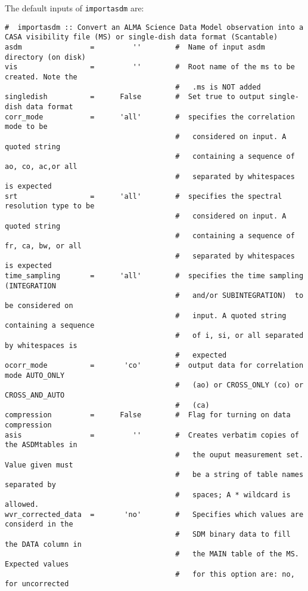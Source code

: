 The default inputs of {\tt importasdm} are:

\small
\begin{verbatim}
#  importasdm :: Convert an ALMA Science Data Model observation into a CASA visibility file (MS) or single-dish data format (Scantable)
asdm                =         ''        #  Name of input asdm directory (on disk)
vis                 =         ''        #  Root name of the ms to be created. Note the
                                        #   .ms is NOT added
singledish          =      False        #  Set true to output single-dish data format
corr_mode           =      'all'        #  specifies the correlation mode to be
                                        #   considered on input. A quoted string
                                        #   containing a sequence of ao, co, ac,or all
                                        #   separated by whitespaces is expected
srt                 =      'all'        #  specifies the spectral resolution type to be
                                        #   considered on input. A quoted string
                                        #   containing a sequence of fr, ca, bw, or all
                                        #   separated by whitespaces is expected
time_sampling       =      'all'        #  specifies the time sampling (INTEGRATION
                                        #   and/or SUBINTEGRATION)  to be considered on
                                        #   input. A quoted string containing a sequence
                                        #   of i, si, or all separated by whitespaces is
                                        #   expected
ocorr_mode          =       'co'        #  output data for correlation mode AUTO_ONLY
                                        #   (ao) or CROSS_ONLY (co) or CROSS_AND_AUTO
                                        #   (ca)
compression         =      False        #  Flag for turning on data compression
asis                =         ''        #  Creates verbatim copies of the ASDMtables in
                                        #   the ouput measurement set.  Value given must
                                        #   be a string of table names separated by
                                        #   spaces; A * wildcard is allowed.
wvr_corrected_data  =       'no'        #   Specifies which values are considerd in the
                                        #   SDM binary data to fill the DATA column in
                                        #   the MAIN table of the MS. Expected values
                                        #   for this option are: no, for uncorrected

\end{verbatim}
